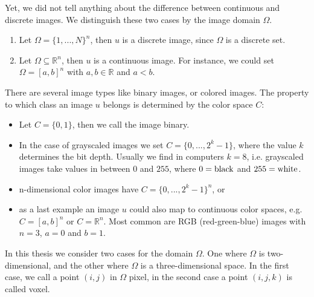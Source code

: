     \begin{remark} %
    \label{rem:continuous_vs_discrete}
        
        Yet, we did not tell anything about the difference between continuous and discrete images. We distinguish these two cases by the image domain $\Omega$.
            \begin{enumerate}
                \item Let $\Omega = \{ 1, ..., N \}^{n}$, then $u$ is a discrete image, since $\Omega$ is a discrete set.
                \item Let $\Omega \subseteq \mathbb{R}^{n}$, then $u$ is a continuous image. For instance, we could set $\Omega = [a, b]^{n}$ with $a, b \in \mathbb{R}$ and $a < b$.
            \end{enumerate}
        There are several image types like binary images, or colored images. The property to which class an image $u$ belongs is determined by the color space $C$:
            \begin{itemize}
                \item Let $C = \{ 0, 1 \}$, then we call the image binary.
                \item In the case of grayscaled images we set $C = \{ 0, ..., 2^{k}-1 \}$, where the value $k$ determines the bit depth. Usually we find in computers $k = 8$, i.e. grayscaled images take values in between $0$ and $255$, where $0 = \textnormal{black}$ and $255 = \textnormal{white}$.
                \item n-dimensional color images have $C = \{ 0, ..., 2^{k}-1 \}^{n}$, or
                \item as a last example an image $u$ could also map to continuous color spaces, e.g. $C = [a, b]^{n}$ or $C = \mathbb{R}^{n}$. Most common are RGB (red-green-blue) images with $n = 3$, $a = 0$ and $b = 1$.
            \end{itemize}

        In this thesis we consider two cases for the domain $\Omega$. One where $\Omega$ is two-dimensional, and the other where $\Omega$ is a three-dimensional space. In the first case, we call a point $(i, j)$ in $\Omega$ pixel, in the second case a point $(i, j, k)$ is called voxel.

    \end{remark}

        
